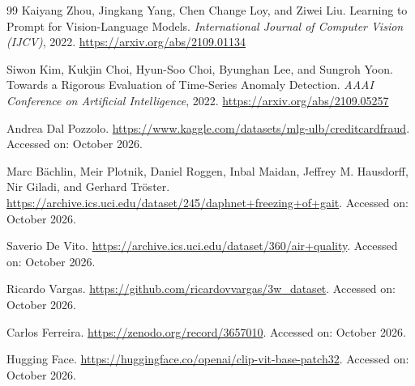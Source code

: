 \documentclass[10pt,twocolumn]{article}
\begin{document}
\begin{thebibliography}{99}
Kaiyang Zhou, Jingkang Yang, Chen Change Loy, and Ziwei Liu.
Learning to Prompt for Vision-Language Models.
\textit{International Journal of Computer Vision (IJCV)}, 2022.
\url{https://arxiv.org/abs/2109.01134}

Siwon Kim, Kukjin Choi, Hyun-Soo Choi, Byunghan Lee, and Sungroh Yoon.
Towards a Rigorous Evaluation of Time-Series Anomaly Detection.
\textit{AAAI Conference on Artificial Intelligence}, 2022.
\url{https://arxiv.org/abs/2109.05257}

Andrea Dal Pozzolo.
\url{https://www.kaggle.com/datasets/mlg-ulb/creditcardfraud}.
Accessed on: October 2026.

Marc Bächlin, Meir Plotnik, Daniel Roggen, Inbal Maidan, Jeffrey M. Hausdorff, Nir Giladi, and Gerhard Tröster.
\url{https://archive.ics.uci.edu/dataset/245/daphnet+freezing+of+gait}.
Accessed on: October 2026.

Saverio De Vito.
\url{https://archive.ics.uci.edu/dataset/360/air+quality}.
Accessed on: October 2026.

Ricardo Vargas.
\url{https://github.com/ricardovvargas/3w_dataset}.
Accessed on: October 2026.

Carlos Ferreira.
\url{https://zenodo.org/record/3657010}.
Accessed on: October 2026.

Hugging Face.
\url{https://huggingface.co/openai/clip-vit-base-patch32}.
Accessed on: October 2026.

\end{thebibliography}
\end{document}
